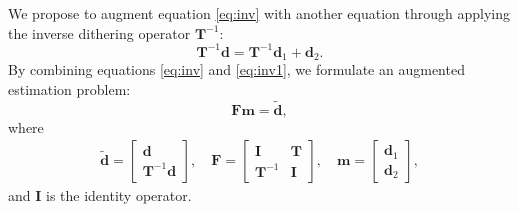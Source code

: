 We propose to augment equation \ref{eq:inv} with another equation through applying the inverse dithering operator $\mathbf{T}^{-1}$:
\begin{equation}
\label{eq:inv1}
\mathbf{T}^{-1}\mathbf{d}=\mathbf{T}^{-1}\mathbf{d}_1+\mathbf{d}_2.
\end{equation}
By combining equations \ref{eq:inv} and \ref{eq:inv1}, we formulate an augmented estimation problem:
\begin{equation}
\label{eq:esti}
\mathbf{Fm}=\mathbf{\tilde{d}},
\end{equation}
where
\begin{eqnarray}
\label{eq:note}
\mathbf{\tilde{d}}=
\left[\begin{array}{cc}
\mathbf{d}\\
\mathbf{T}^{-1}\mathbf{d}
\end{array}\right],
\quad
\mathbf{F}=
\left[\begin{array}{cc}
\mathbf{I} 	& \mathbf{T}\\
\mathbf{T}^{-1} & \mathbf{I}
\end{array}\right],
\quad
\mathbf{m}=
\left[\begin{array}{cc}
\mathbf{d}_1\\
\mathbf{d}_2
\end{array}\right],
\end{eqnarray}
and $\mathbf{I}$ is the identity operator.

